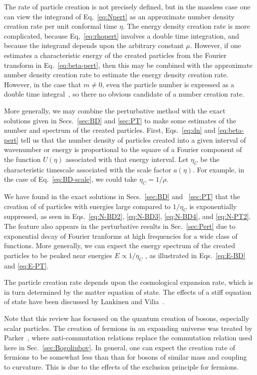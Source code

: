 \documentclass[12pt,onecolumn,eqsecnum,floats,aps,prd,floatfix,titlepage,tightenlines]{revtex4-2}
\begin{document}
The rate of particle creation is not precisely defined, but in the massless case one can  view the
integrand of Eq,~\eqref{eq:Npert} as an approximate number density creation rate per
unit conformal time $\eta$. The energy density creation rate is more complicated, because
Eq,~\eqref{eq:rhopert} involves a double time integration, and because the integrand depends
upon the arbitrary constant $\mu$. However, if one estimates a characteristic energy of the created 
particles from the Fourier transform in Eq.~\eqref{eq:beta-pert}, then this may be combined with
the  approximate number density creation rate to estimate the energy density creation rate.
However, in the case that $m \not= 0$, even the particle number is expressed as a double 
time integral~\cite{BD2}, so there no obvious candidate of a number creation rate.

More generally, we may combine the perturbative method with the exact solutions given in
Secs.~\ref{sec:BD} and \ref{sec:PT} to make some estimates of the number and spectrum
of the created particles. First, Eqs.~\eqref{eq:dn}  and \eqref{eq:beta-pert} tell us that the
number density of particles created into a given interval of wavenumber or energy is proportional
to the square of a Fourier component of the function $U(\eta)$ associated with that energy interval.
Let $\eta_C$ be the characteristic timescale associated with the scale factor $a(\eta)$. For example, in
the case of Eq.~\eqref{eq:BD-scale}, we could take $\eta_C = 1/\rho$. 

We have found in the exact solutions in Secs.~\ref{sec:BD} and ~\ref{sec:PT} that the creation of
of particles with energies large compared to $1/\eta_C$ is exponentially suppressed, as seen in 
Eqs.~\eqref{eq:N-BD2}, \eqref{eq:N-BD3}, \eqref{eq:N-BD4}, and \eqref{eq:N-PT2}. The feature
also appears in the perturbative results in Sec.~\ref{sec:Pert} due to exponential decay of Fourier
tranforms at high frequencies for a wide class of functions. More generally, we can expect the
energy spectrum of the created particles to be peaked near energies $E \propto 1/\eta_C$ , as 
illustrated in Eqs.~\eqref {eq:E-BD} and \eqref{eq:E-PT}. 

The particle creation rate depends upon the cosmological expansion rate, which is in turn determined
by the matter equation of state. The effects of a stiff equation of state have been discussed by
Lankinen and Vilia~\cite{Lankinen2017}.   

Note that this review has focussed on the quantum creation of bosons, especially scalar particles.
The creation of fermions in an expanding universe was treated by Parker~\cite{Parker71}, where
anti-commutation relations replace the commutation relation used here in Sec.~\ref{sec:Bogoliubov}.
In general, one can expect the creation rate of fermions to be somewhat less than than for bosons
of similar mass and coupling to curvature. This is due to the effects of the exclusion principle for
fermions.
\end{document}
